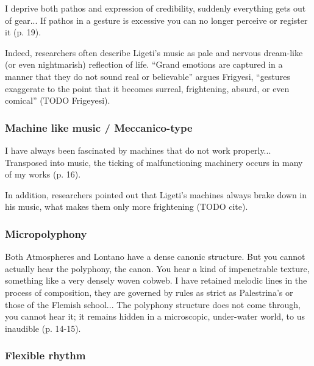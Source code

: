 \documentclass[a4paper,11pt]{article}
\newenvironment{MyShadequote}[1][]{%
    \ignorespaces%
    \begin{mdframed}[style=MyShadeQuoteStyle,#1]%
}{%
    \end{mdframed}%
    \ignorespacesafterend%
}%
\begin{document}
\begin{MyShadequote}
  I deprive both pathos and expression of credibility, suddenly everything gets out of gear...
  If pathos in a gesture is excessive you can no longer perceive or register it (p. 19).
\end{MyShadequote}

Indeed, researchers often describe Ligeti's music as pale and nervous dream-like (or even nightmarish) reflection of life.
``Grand emotions are captured in a manner that they do not sound real or believable'' argues Frigyesi, ``gestures exaggerate to the point that it becomes surreal, frightening, absurd, or even comical'' (TODO Frigeyesi).

\subsubsection{Machine like music / Meccanico-type}
\label{subs:ligeti:machine}

\begin{MyShadequote}
  I have always been fascinated by machines that do not work properly...
  Transposed into music, the ticking of malfunctioning machinery occurs in many of my works (p. 16).
\end{MyShadequote}

In addition, researchers pointed out that Ligeti's machines always brake down in his music, what makes them only more frightening (TODO cite).

\subsubsection{Micropolyphony}
\label{subs:ligeti:micropolyphony}

\begin{MyShadequote}
  Both Atmospheres and Lontano have a dense canonic structure.
  But you cannot actually hear the polyphony, the canon.
  You hear a kind of impenetrable texture, something like a very densely woven cobweb.
  I have retained melodic lines in the process of composition, they are governed by rules as strict as Palestrina’s or those of the Flemish school...
  The polyphony structure does not come through, you cannot hear it; it remains hidden in a microscopic, under-water world, to us inaudible (p. 14-15).
\end{MyShadequote}

\subsubsection{Flexible rhythm}
\label{subs:ligeti:flexible}
\end{document}
